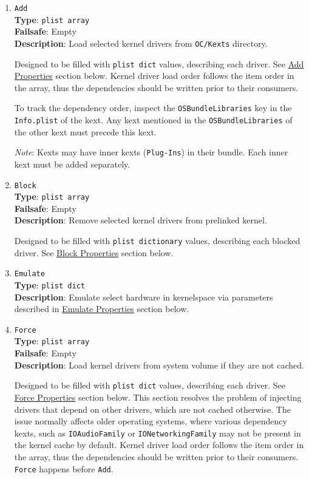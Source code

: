 \documentclass[]{article}
\begin{document}
\begin{enumerate}
\item
  \texttt{Add}\\
  \textbf{Type}: \texttt{plist\ array}\\
  \textbf{Failsafe}: Empty\\
  \textbf{Description}: Load selected kernel drivers from \texttt{OC/Kexts} directory.

  Designed to be filled with \texttt{plist\ dict} values, describing each driver.
  See \hyperref[kernelpropsadd]{Add Properties} section below. Kernel driver load
  order follows the item order in the array, thus the dependencies should be written
  prior to their consumers.

  To track the dependency order, inspect the \texttt{OSBundleLibraries} key
  in the \texttt{Info.plist} of the kext. Any kext mentioned in the
  \texttt{OSBundleLibraries} of the other kext must precede this kext.

  \emph{Note}: Kexts may have inner kexts (\texttt{Plug-Ins}) in their bundle. Each
  inner kext must be added separately.

\item
  \texttt{Block}\\
  \textbf{Type}: \texttt{plist\ array}\\
  \textbf{Failsafe}: Empty\\
  \textbf{Description}: Remove selected kernel drivers from prelinked kernel.

  Designed to be filled with \texttt{plist\ dictionary} values, describing each
  blocked driver. See \hyperref[kernelpropsblock]{Block Properties} section below.

\item
  \texttt{Emulate}\\
  \textbf{Type}: \texttt{plist\ dict}\\
  \textbf{Description}: Emulate select hardware in kernelspace via parameters
  described in \hyperref[kernelpropsemu]{Emulate Properties} section below.

\item
  \texttt{Force}\\
  \textbf{Type}: \texttt{plist\ array}\\
  \textbf{Failsafe}: Empty\\
  \textbf{Description}: Load kernel drivers from system volume if they are not cached.

  Designed to be filled with \texttt{plist\ dict} values, describing each driver.
  See \hyperref[kernelpropsforce]{Force Properties} section below.
  This section resolves the problem of injecting drivers that depend on other
  drivers, which are not cached otherwise. The issue normally affects older
  operating systems, where various dependency kexts, such as \texttt{IOAudioFamily}
  or \texttt{IONetworkingFamily} may not be present in the kernel cache by default.
  Kernel driver load order follows the item order in the array, thus the dependencies
  should be written prior to their consumers. \texttt{Force} happens before
  \texttt{Add}.


\end{enumerate}
\end{document}
